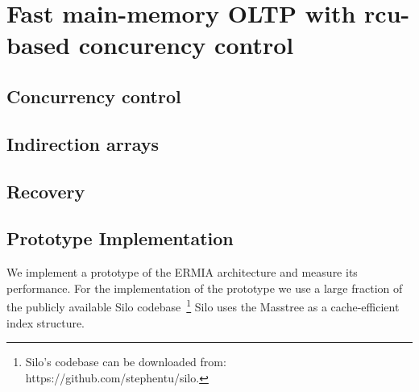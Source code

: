 
\section{Fast main-memory OLTP with rcu-based concurency control}



\subsection{Concurrency control}

\subsection{Indirection arrays}

\subsection{Recovery}

\subsection{Prototype Implementation}

We implement a prototype of the ERMIA architecture and measure its performance.  For the implementation of the prototype we use a large fraction of the publicly available Silo codebase~\footnote{Silo's codebase can be downloaded from: https://github.com/stephentu/silo.} Silo uses the Masstree \cite{MaoKM12} as a cache-efficient index structure. 
